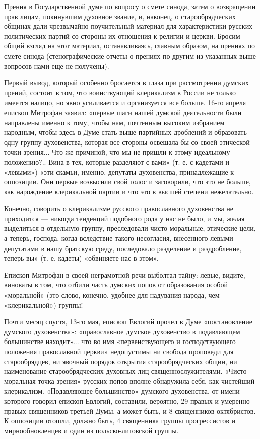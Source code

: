 \documentclass[12pt]{article}
\newcommand{\parnum}{(\arabic{parcount})}
\newcounter{parcount}
\newenvironment{parnumbers}{%
  \par%
  \everypar{\noindent \stepcounter{parcount}\marginpar[]{\parnum}}%
}{}
\begin{document}
\begin{parnumbers}
Прения в Государственной думе по вопросу о смете синода, затем о возвращении прав лицам, покинувшим духовное звание, и, наконец, о старообрядческих общинах дали чрезвычайно поучительный материал для характеристики русских политических партий со стороны их отношения к религии и церкви. Бросим общий взгляд на этот материал, останавливаясь, главным образом, на прениях по смете синода (стенографические отчеты о прениях по другим из указанных выше вопросов нами еще не получены).

Первый вывод, который особенно бросается в глаза при рассмотрении думских прений, состоит в том, что воинствующий клерикализм в России не только имеется налицо, но явно усиливается и организуется все больше. 16-го апреля епископ Митрофан заявил: «первые шаги нашей думской деятельности были направлены именно к тому, чтобы нам, почтенным высоким избранием народным, чтобы здесь в Думе стать выше партийных дроблений и образовать одну группу духовенства, которая все стороны освещала бы со своей этической точки зрения... Что же причиной, что мы не пришли к этому идеальному положению?.. Вина в тех, которые разделяют с вами» (т. е. с кадетами и «левыми») «эти скамьи, именно, депутаты духовенства, принадлежащие к оппозиции. Они первые возвысили свой голос и заговорили, что это не больше, как нарождение клерикальной партии и что это в высшей степени нежелательно.

Конечно, говорить о клерикализме русского православного духовенства не приходится — никогда тенденций подобного рода у нас не было, и мы, желая выделиться в отдельную группу, преследовали чисто моральные, этические цели, а теперь, господа, когда вследствие такого несогласия, внесенного левыми депутатами в нашу братскую среду, последовало разделение и раздробление, теперь вы» (т. е. кадеты) «обвиняете нас в этом».

Епископ Митрофан в своей неграмотной речи выболтал тайну: левые, видите, виноваты в том, что отбили часть думских попов от образования особой «моральной» (это слово, конечно, удобнее для надувания народа, чем «клерикальной») группы!

Почти месяц спустя, 13-го мая, епископ Евлогий прочел в Думе «постановление думского духовенства»: «православное думское духовенство в подавляющем большинстве находит»... что во имя «первенствующего и господствующего положения православной церкви» недопустимы ни свобода проповеди для старообрядцев, ни явочный порядок открытия старообрядческих общин, ни наименование старообрядческих духовных лиц священнослужителями. «Чисто моральная точка зрения» русских попов вполне обнаружила себя, как чистейший клерикализм. «Подавляющее большинство» думского духовенства, от имени которого говорил епископ Евлогий, составили, вероятно, 29 правых и умеренно правых священников третьей Думы, а может быть, и 8 священников октябристов. К оппозиции отошли, должно быть, 4 священника группы прогрессистов и мирнообновленцев и один из польско-литовской группы.


\end{parnumbers}
\end{document}
